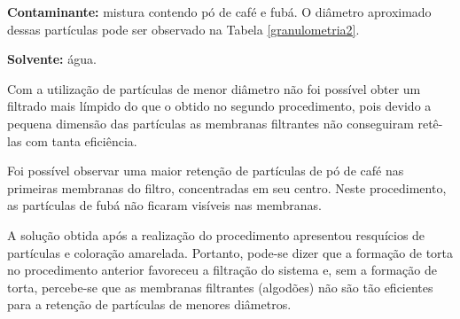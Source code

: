 \textbf{Contaminante:} mistura contendo pó de café e fubá. O
diâmetro aproximado dessas partículas pode ser observado na Tabela
\ref{granulometria2}.

\textbf{Solvente:} água.

Com a utilização de partículas de menor diâmetro não foi possível obter um
filtrado mais límpido do que o obtido no segundo procedimento, pois devido a
pequena dimensão das partículas as membranas filtrantes não conseguiram retê-las
com tanta eficiência.

Foi possível observar uma maior retenção de partículas de pó de café nas
primeiras membranas do filtro, concentradas em seu centro. Neste procedimento,
as partículas de fubá não ficaram visíveis nas membranas.

A solução obtida após a realização do procedimento apresentou resquícios de
partículas e coloração amarelada. Portanto, pode-se dizer que a formação de
torta no procedimento anterior favoreceu a filtração do sistema e, sem a
formação de torta, percebe-se que as membranas filtrantes (algodões) não são tão
eficientes para a retenção de partículas de menores diâmetros.




